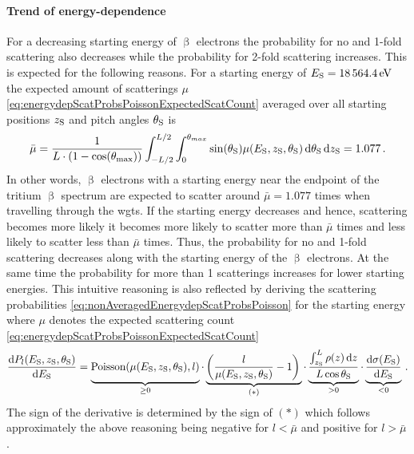 \paragraph{Trend of energy-dependence}
For a decreasing starting energy of $\upbeta$ electrons the probability for no and 1-fold scattering also decreases while the probability for 2-fold scattering increases. This is expected for the following reasons. For a starting energy of $E_\mathrm{S}=\SI{18564.4}{eV}$ the expected amount of scatterings $\mu$ \eqref{eq:energydepScatProbsPoissonExpectedScatCount} averaged over all starting positions $z_\mathrm{S}$ and pitch angles $\theta_\mathrm{S}$ is
\begin{equation}
    \bar{\mu} = 
      \frac{1}{L \cdot (1-\cos(\theta_\mathrm{max}))} 
      \int_{-L/2}^{L/2}  
          \int_{0}^{\theta_{max}} 
            \sin(\theta_\mathrm{S})
            \mu(E_\mathrm{S},z_\mathrm{S},\theta_\mathrm{S})
          \mathop{}\!\mathrm{d}\theta_\mathrm{S}
      \mathop{}\!\mathrm{d}z_\mathrm{S} = 1.077
      \text{\,.}
\end{equation}
In other words, $\upbeta$ electrons with a starting energy near the endpoint of the tritium $\upbeta$ spectrum are expected to scatter around $\bar{\mu}=1.077$ times when travelling through the \gls{wgts}. If the starting energy decreases and hence, scattering becomes more likely it becomes more likely to scatter more than $\bar{\mu}$ times and less likely to scatter less than $\bar{\mu}$ times. Thus, the probability for no and 1-fold scattering decreases along with the starting energy of the $\upbeta$ electrons. At the same time the probability for more than 1 scatterings increases for lower starting energies. This intuitive reasoning is also reflected by deriving the scattering probabilities \eqref{eq:nonAveragedEnergydepScatProbsPoisson} for the starting energy where $\mu$ denotes the expected scattering count \eqref{eq:energydepScatProbsPoissonExpectedScatCount}
\begin{equation}
    \frac{\d P_l(\Esource,\zSource,\thetaSource)}
    {\d \Esource} =
    \underbrace{
        \mathrm{Poisson}(\mu(\Esource,\zSource,\thetaSource),l)
        \vphantom{\frac{\d \sigma(\Esource)}{\d \Esource}}
    }_{\geq 0} \cdot
    \underbrace{
        \left(
            \frac{l}{\mu(\Esource,\zSource,\thetaSource)} -1
        \right)
        \vphantom{\frac{\d \sigma(\Esource)}{\d \Esource}}
    }_{(*)} \cdot
    \underbrace{
    \frac{\int_{\zSource}^{L} \rho(z) \d z}
    {L \cos\thetaSource}
    \vphantom{\frac{\d \sigma(\Esource)}{\d \Esource}}
    }_{>0} \cdot
    \underbrace{
        \frac{\d \sigma(\Esource)}{\d \Esource}
    }_{<0} \fullstop
\end{equation}
 The sign of the derivative is determined by the sign of $(*)$ which follows approximately the above reasoning being negative for $l<\bar{\mu}$ and positive for $l>\bar{\mu}$.

